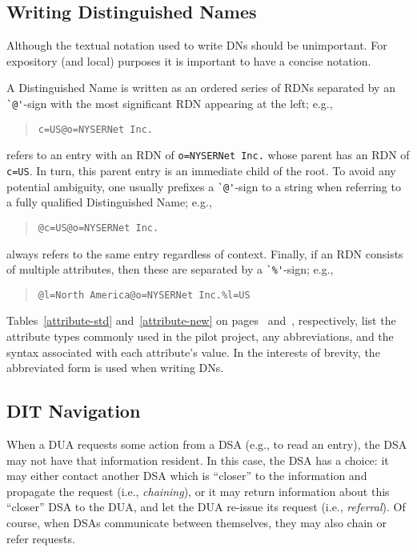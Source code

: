 \subsection	{Writing Distinguished Names}
Although the textual notation used to write DNs should be unimportant.
For expository (and local) purposes it is important to have a concise notation.

A Distinguished Name is written as an ordered series of RDNs separated by
an \verb"`@'"-sign with the most significant RDN appearing at the left;
e.g.,
\begin{quote}\small\begin{verbatim}
c=US@o=NYSERNet Inc.
\end{verbatim}\end{quote}
refers to an entry with an RDN of \verb"o=NYSERNet Inc."
whose parent has an RDN of \verb"c=US".
In turn,
this parent entry is an immediate child of the root.
To avoid any potential ambiguity,
one usually prefixes a \verb"`@'"-sign to a string when referring to a fully
qualified Distinguished Name;
e.g.,
\begin{quote}\small\begin{verbatim}
@c=US@o=NYSERNet Inc.
\end{verbatim}\end{quote}
always refers to the same entry regardless of context.
Finally,
if an RDN consists of multiple attributes,
then these are separated by a \verb"`%'"-sign;
e.g.,
\begin{quote}\small\begin{verbatim}
@l=North America@o=NYSERNet Inc.%l=US
\end{verbatim}\end{quote}

Tables~\ref{attribute-std} and~\ref{attribute-new}
on pages~\pageref{attribute-std} and~\pageref{attribute-new},
respectively,
list the attribute types commonly used in the pilot project,
any abbreviations, and the syntax associated with each attribute's value.
In the interests of brevity,
the abbreviated form is used when writing DNs.

\subsection	{DIT Navigation}
When a DUA requests some action from a DSA
(e.g., to read an entry),
the DSA may not have that information resident.
In this case,
the DSA has a choice:
it may either contact another DSA which is ``closer'' to the information and
propagate the request
(i.e., {\em chaining\/}),
or it may return information about this ``closer'' DSA to the DUA,
and let the DUA re-issue its request (i.e., {\em referral\/}).
Of course,
when DSAs communicate between themselves,
they may also chain or refer requests.

